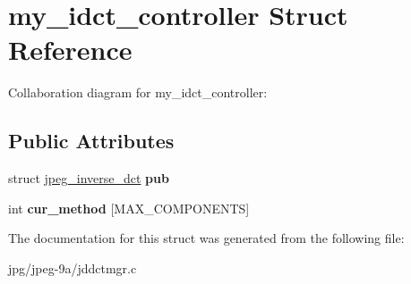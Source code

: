 \hypertarget{structmy__idct__controller}{\section{my\+\_\+idct\+\_\+controller Struct Reference}
\label{structmy__idct__controller}
}


Collaboration diagram for my\+\_\+idct\+\_\+controller\+:
\subsection*{Public Attributes}
\begin{DoxyCompactItemize}
\item 
\hypertarget{structmy__idct__controller_ace0aef71b868fc10da51a4be6f8b56ca}{struct \hyperlink{structjpeg__inverse__dct}{jpeg\+\_\+inverse\+\_\+dct} {\bfseries pub}}\label{structmy__idct__controller_ace0aef71b868fc10da51a4be6f8b56ca}

\item 
\hypertarget{structmy__idct__controller_ac13e3955a30c7b2a75c835dc803182cb}{int {\bfseries cur\+\_\+method} \mbox{[}M\+A\+X\+\_\+\+C\+O\+M\+P\+O\+N\+E\+N\+T\+S\mbox{]}}\label{structmy__idct__controller_ac13e3955a30c7b2a75c835dc803182cb}

\end{DoxyCompactItemize}


The documentation for this struct was generated from the following file\+:\begin{DoxyCompactItemize}
\item 
jpg/jpeg-\/9a/jddctmgr.\+c\end{DoxyCompactItemize}
